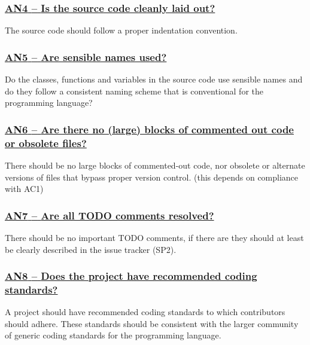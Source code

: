 \documentclass[a4paper,11pt]{article}
\newcommand{\criterion}[1]{\subsubsection*{\underline{#1}}}
\begin{document}
\newcommand{\anFourID}{AN4}
\newcommand{\anFourText}{Is the source code cleanly laid out?}
\criterion{\anFourID{ }--{ }\anFourText}\label{id:an4} 

The source code should follow a proper indentation convention. 

\newcommand{\anFiveID}{AN5}
\newcommand{\anFiveText}{Are sensible names used?}
\criterion{\anFiveID{ }--{ }\anFiveText}\label{id:an5} 

Do the classes, functions and variables in the source code use sensible names
and do they follow a consistent naming scheme that is conventional for the
programming language?

\newcommand{\anSixID}{AN6}
\newcommand{\anSixText}{Are there no (large) blocks of commented out code or obsolete files?}
\criterion{\anSixID{ }--{ }\anSixText}\label{id:an6} 

There should be no large blocks of commented-out code, nor obsolete or
alternate versions of files that bypass proper version control.
(this depends on compliance with AC1)

\newcommand{\anSevenID}{AN7}
\newcommand{\anSevenText}{Are all TODO comments resolved?}
\criterion{\anSevenID{ }--{ }\anSevenText}\label{id:an7} 

There should be no important TODO comments, if there are they should at least be
clearly described in the issue tracker (SP2).

\newcommand{\anEightID}{AN8}
\newcommand{\anEightText}{Does the project have recommended coding standards?}
\criterion{\anEightID{ }--{ }\anEightText}\label{id:an8} 

A project should have recommended coding standards to which contributors
should adhere. These standards should be consistent with the larger community
of generic coding standards for the programming language.
\end{document}
